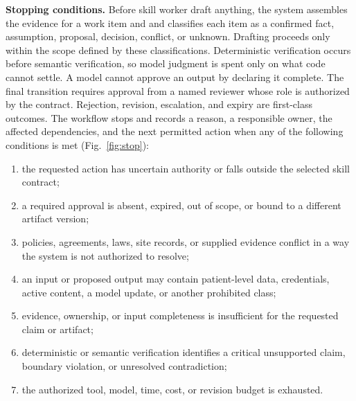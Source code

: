 \documentclass[preprint,5p, 10pt, times]{elsarticle}
\begin{document}
\textbf{Stopping conditions.}
% 
Before skill worker draft anything, 
the system assembles the evidence for a work item and and classifies each item as a confirmed fact, assumption, proposal, decision, conflict, or unknown. Drafting proceeds only within the scope defined by these classifications. Deterministic verification occurs before semantic verification, so model judgment is spent only on what code cannot settle. A model cannot approve an output by declaring it complete. The final transition requires approval from a named reviewer whose role is authorized by the contract.
%
Rejection, revision, escalation, and expiry are first-class outcomes. The workflow stops and records a reason, a responsible owner, the affected dependencies, and the next permitted action when any of the following conditions is met (Fig.~\ref{fig:stop}):

\begin{enumerate}
\item the requested action has uncertain authority or falls outside the selected skill contract;
\item a required approval is absent, expired, out of scope, or bound to a different artifact version;
\item policies, agreements, laws, site records, or supplied evidence conflict in a way the system is not
      authorized to resolve;
\item an input or proposed output may contain patient-level data, credentials, active content, a model
      update, or another prohibited class;
\item evidence, ownership, or input completeness is insufficient for the requested claim or artifact;
\item deterministic or semantic verification identifies a critical unsupported claim, boundary violation, or
      unresolved contradiction;
\item the authorized tool, model, time, cost, or revision budget is exhausted.
\end{enumerate}
\end{document}
